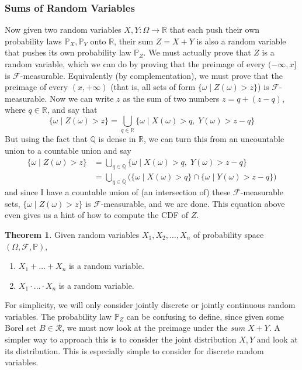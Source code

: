 \documentclass{article}
\theoremstyle{definition}
\newtheorem{theorem}{Theorem}[section]
\theoremstyle{remark}
\theoremstyle{definition}
\begin{document}
\subsubsection{Sums of Random Variables}

Now given two random variables $X, Y: \Omega \rightarrow \mathbb{R}$ that each push their own probability laws $\mathbb{P}_X, \mathbb{P}_Y$ onto $\mathbb{R}$, their sum $Z = X + Y$ is also a random variable that pushes its own probability law $\mathbb{P}_Z$. We must actually prove that $Z$ is a random variable, which we can do by proving that the preimage of every $(-\infty, x]$ is $\mathcal{F}$-measurable. Equivalently (by complementation), we must prove that the preimage of every $(x, +\infty)$ (that is, all sets of form $\{ \omega \mid Z(\omega) > z\}$) is $\mathcal{F}$-measurable. Now we can write $z$ as the sum of two numbers $z = q + (z - q)$, where $q \in \mathbb{R}$, and say that 
\[\{ \omega \mid Z(\omega) > z\} = \bigcup_{q \in \mathbb{R}} \{ \omega \mid X (\omega) > q , \; Y(\omega) > z - q\}\]
But using the fact that $\mathbb{Q}$ is dense in $\mathbb{R}$, we can turn this from an uncountable union to a countable union and say 
\begin{align*}
    \{ \omega \mid Z(\omega) > z\} & = \bigcup_{q \in \mathbb{Q}} \{ \omega \mid X (\omega) > q , \; Y(\omega) > z - q\} \\
    & = \bigcup_{q \in \mathbb{Q}} \big( \{\omega \mid X(\omega) > q\} \cap \{ \omega \mid Y(\omega) > z - q\} \big) 
\end{align*}
and since I have a countable union of (an intersection of) these $\mathcal{F}$-measurable sets, $\{ \omega \mid Z(\omega) > z\}$ is $\mathcal{F}$-measurable, and we are done. This equation above even gives us a hint of how to compute the CDF of $Z$. 

\begin{theorem}
Given random variables $X_1, X_2, \ldots, X_n$ of probability space $(\Omega, \mathcal{F}, \mathbb{P})$, 
\begin{enumerate}
    \item $X_1 + \ldots + X_n$ is a random variable.
    \item $X_1 \cdot \ldots \cdot X_n$ is a random variable. 
\end{enumerate}
\end{theorem}

For simplicity, we will only consider jointly discrete or jointly continuous random variables. The probability law $\mathbb{P}_Z$ can be confusing to define, since given some Borel set $B \in \mathcal{R}$, we must now look at the preimage under the \textit{sum} $X + Y$. A simpler way to approach this is to consider the joint distribution $X, Y$ and look at its distribution. This is especially simple to consider for discrete random variables. 
\end{document}
